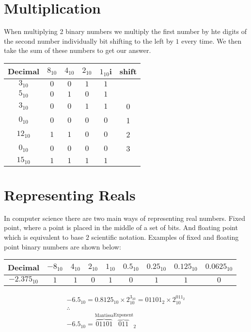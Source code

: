 \documentclass{article}
\begin{document}
\section{Multiplication}
When multiplying 2 binary numbers we multiply the first number by hte digits of the second number
individually bit shifting to the left by $1$ every time. We then take the sum of these numbers to
get our answer.

\begin{center}
  \begin{tabular}{c | c | c | c | c | c}
    Decimal & $8_{10}$ & $4_{10}$ & $2_{10}$ & $1_{10}$i & shift\\ \hline
    $3_{10}$ & $0$ & $0$ & $1$ & $1$ & \\
    $5_{10}$ & $0$ & $1$ & $0$ & $1$ &\\ \hline
    $3_{10}$& $0$ &  $0$ & $1$ & $1$ & 0\\
    $0_{10}$& $0$ &  $0$ & $0$ & $0$ & 1\\
    $12_{10}$& $1$ &  $1$ & $0$ & $0$& 2\\
    $0_{10}$& $0$ &  $0$ & $0$ & $0$& 3\\ \hline
    $15_{10}$& $1$ &  $1$ & $1$ & $1$\\
  \end{tabular}
\end{center}

\section{Representing Reals}
In computer science there are two main ways of representing real numbers. Fixed point, where a point is placed in the middle of
a set of bits. And floating point which is equivalent to base $2$ scientific notation. Examples of fixed and floating point
binary numbers are shown below:

\begin{center}
  \begin{tabular}{ | c | c | c | c | c | c | c | c | c |}
    \hline
    Decimal & $-8_{10}$ & $4_{10}$ & $2_{10}$ & $1_{10}$ & $0.5_{10}$ & $0.25_{10}$ & $0.125_{10}$ & $0.0625_{10}$\\ \hline
    $-2.375_{10}$ & $1$ & $1$ & $0$ & $1$ & $0$ & $1$ & $1$ & $0$\\ 
    \hline
  \end{tabular}
\end{center}

\begin{gather}
	-6.5_{10} = 0.8125_{10} \times 2_{10}^{3_{10}} = 01101_2 \times 2_{10}^{011_2} \\
	\therefore \\
	-6.5_{10} = {\overbrace{01101}^{\text{Mantissa}}\overbrace{011}^{\text{Exponent}}}_2
\end{gather}
\end{document}

